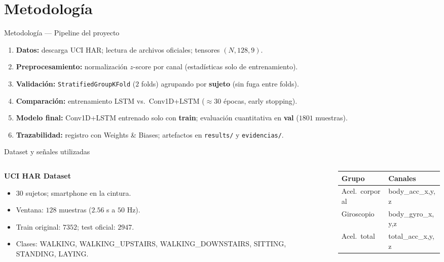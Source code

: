 \documentclass[aspectratio=169]{beamer}
\begin{document}
\section{Metodología}

\begin{frame}{Metodología — Pipeline del proyecto}
  \begin{enumerate}
    \item \textbf{Datos:} descarga UCI HAR; lectura de archivos oficiales; tensores $(N, 128, 9)$.
    \item \textbf{Preprocesamiento:} normalización $z$-score por canal (estadísticas solo de entrenamiento).
    \item \textbf{Validación:} \texttt{StratifiedGroupKFold} ($2$ folds) agrupando por \textbf{sujeto} (sin fuga entre folds).
    \item \textbf{Comparación:} entrenamiento LSTM vs.\ Conv1D+LSTM ($\approx 30$ épocas, early stopping).
    \item \textbf{Modelo final:} Conv1D+LSTM entrenado solo con \textbf{train}; evaluación cuantitativa en \textbf{val} ($1801$ muestras).
    \item \textbf{Trazabilidad:} registro con Weights \& Biases; artefactos en \texttt{results/} y \texttt{evidencias/}.
  \end{enumerate}
\end{frame}

\begin{frame}{Dataset y señales utilizadas}
  \begin{columns}[T]
    \begin{column}{0.52\textwidth}
      \textbf{UCI HAR Dataset}
      \begin{itemize}
        \item $30$ sujetos; smartphone en la cintura.
        \item Ventana: $128$ muestras ($2.56$ s a $50$ Hz).
        \item Train original: $7352$; test oficial: $2947$.
        \item Clases: WALKING, WALKING\_UPSTAIRS, WALKING\_DOWNSTAIRS, SITTING, STANDING, LAYING.
      \end{itemize}
    \end{column}
    \begin{column}{0.46\textwidth}
      \small
      \begin{tabular}{@{}ll@{}}
        \toprule
        Grupo & Canales \\
        \midrule
        Acel.\ corporal & body\_acc\_x,y,z \\
        Giroscopio & body\_gyro\_x,y,z \\
        Acel.\ total & total\_acc\_x,y,z \\
        \bottomrule
      \end{tabular}
    \end{column}
  \end{columns}
\end{frame}
\end{document}
